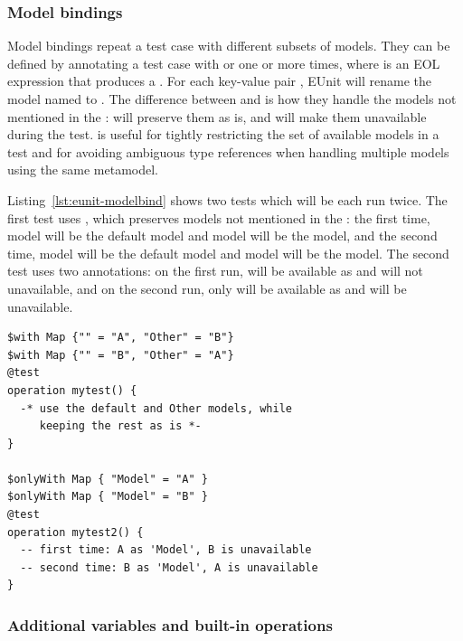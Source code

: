 \subsubsection{Model bindings}

Model bindings repeat a test case with different subsets of models. They can be defined by annotating a test case with  or  one or more times, where  is an EOL expression that produces a . For each key-value pair , EUnit will rename the model named  to . The difference between  and  is how they handle the models not mentioned in the :  will preserve them as is, and  will make them unavailable during the test.  is useful for tightly restricting the set of available models in a test and for avoiding ambiguous type references when handling multiple models using the same metamodel.

Listing~\ref{lst:eunit-modelbind} shows two tests which will be each run twice. The first test uses , which preserves models not mentioned in the : the first time, model  will be the default model and model  will be the  model, and the second time, model  will be the default model and model  will be the  model. The second test uses two  annotations: on the first run,  will be available as  and  will not unavailable, and on the second run, only  will be available as  and  will be unavailable.

\begin{lstlisting}[float=tbp, language=EOL,caption=Examples of model bindings,label=lst:eunit-modelbind,columns=fixed]
$with Map {"" = "A", "Other" = "B"}
$with Map {"" = "B", "Other" = "A"}
@test
operation mytest() {
  -* use the default and Other models, while
     keeping the rest as is *-
}

$onlyWith Map { "Model" = "A" }
$onlyWith Map { "Model" = "B" }
@test
operation mytest2() {
  -- first time: A as 'Model', B is unavailable
  -- second time: B as 'Model', A is unavailable
}
\end{lstlisting}

\subsubsection{Additional variables and built-in operations}

